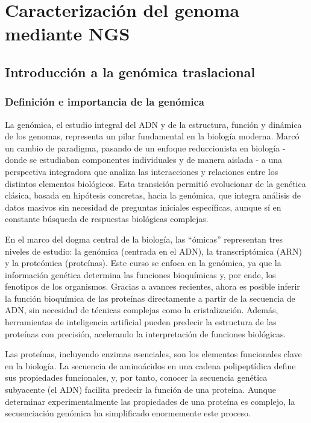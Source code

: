 \chapter{Caracterización del genoma mediante NGS}
\section{Introducción a la genómica traslacional}
\subsection{Definición e importancia de la genómica}
La genómica, el estudio integral del ADN y de la estructura, función y dinámica de los genomas, representa un pilar fundamental en la biología moderna. Marcó un cambio de paradigma, pasando de un enfoque reduccionista en biología - donde se estudiaban componentes individuales y de manera aislada - a una perspectiva integradora que analiza las interacciones y relaciones entre los distintos elementos biológicos. Esta transición permitió evolucionar de la genética clásica, basada en hipótesis concretas, hacia la genómica, que integra análisis de datos masivos sin necesidad de preguntas iniciales específicas, aunque sí en constante búsqueda de respuestas biológicas complejas.

En el marco del dogma central de la biología, las “ómicas” representan tres niveles de estudio: la genómica (centrada en el ADN), la transcriptómica (ARN) y la proteómica (proteínas). Este curso se enfoca en la genómica, ya que la información genética determina las funciones bioquímicas y, por ende, los fenotipos de los organismos. Gracias a avances recientes, ahora es posible inferir la función bioquímica de las proteínas directamente a partir de la secuencia de ADN, sin necesidad de técnicas complejas como la cristalización. Además, herramientas de inteligencia artificial pueden predecir la estructura de las proteínas con precisión, acelerando la interpretación de funciones biológicas.

Las proteínas, incluyendo enzimas esenciales, son los elementos funcionales clave en la biología. La secuencia de aminoácidos en una cadena polipeptídica define sus propiedades funcionales, y, por tanto, conocer la secuencia genética subyacente (el ADN) facilita predecir la función de una proteína. Aunque determinar experimentalmente las propiedades de una proteína es complejo, la secuenciación genómica ha simplificado enormemente este proceso.

